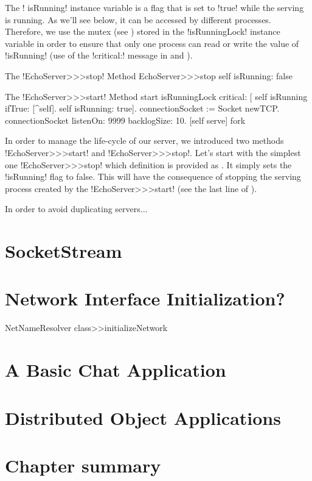 \documentclass[a4paper,10pt,twoside]{book}
\begin{document}
The \ct! isRunning! instance variable is a flag that is set to \ct!true! while the serving is running.
As we'll see below, it can be accessed by different processes.
Therefore, we use the mutex (see ) stored in the \ct!isRunningLock! instance variable in order to ensure that only one process can read or write the value of \ct!isRunning! (use of the \ct!critical:! message in  and ).

\begin{method}{The \ct!EchoServer>>>stop! Method}
EchoServer>>>stop
	self isRunning: false
\end{method}

\begin{method}{The \ct!EchoServer>>>start! Method}
start
	isRunningLock critical: [
		self isRunning ifTrue: [^self].
		self isRunning: true].
	connectionSocket := Socket newTCP.
	connectionSocket listenOn: 9999 backlogSize: 10.
	[self serve] fork
\end{method}

In order to manage the life-cycle of our server, we introduced two methods \ct!EchoServer>>>start! and \ct!EchoServer>>>stop!.
Let's start with the simplest one \ct!EchoServer>>>stop! which definition is provided as .
It simply sets the \ct!isRunning! flag  to false.
This will have the consequence of stopping the serving process created by the \ct!EchoServer>>>start! (see the last line of ).

In order to avoid duplicating servers...

\section{SocketStream}
\section{Network Interface Initialization?}
NetNameResolver class>>initializeNetwork
\section{A Basic Chat Application}
\section{Distributed Object Applications}
\section{Chapter summary}


\ifx\wholebook\relax\else
\end{document}
